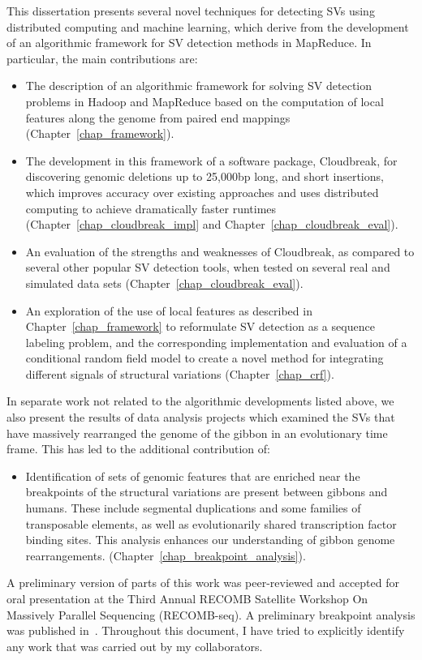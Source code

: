 This dissertation presents several novel techniques for detecting SVs using distributed computing and machine learning, which derive from the development of an algorithmic framework for SV detection methods in MapReduce. In particular, the main contributions are:

\begin{itemize}
 \item The description of an algorithmic framework for solving SV detection problems in Hadoop and MapReduce based on the computation of local features along the genome from paired end mappings (Chapter~\ref{chap_framework}).
 \item The development in this framework of a software package, Cloudbreak, for discovering genomic deletions up to 25,000bp long, and short insertions, which improves accuracy over existing approaches and uses distributed computing to achieve dramatically faster runtimes (Chapter~\ref{chap_cloudbreak_impl} and Chapter~\ref{chap_cloudbreak_eval}).
 \item An evaluation of the strengths and weaknesses of Cloudbreak, as compared to several other popular SV detection tools, when tested on several real and simulated data sets (Chapter~\ref{chap_cloudbreak_eval}).
 \item An exploration of the use of local features as described in Chapter~\ref{chap_framework} to reformulate SV detection as a sequence labeling problem, and the corresponding implementation and evaluation of a conditional random field model to create a novel method for integrating different signals of structural variations (Chapter~\ref{chap_crf}).
\end{itemize}

In separate work not related to the algorithmic developments listed above, we also present the results of data analysis projects which examined the SVs that have massively rearranged the genome of the gibbon in an evolutionary time frame. This has led to the additional contribution of:

\begin{itemize}
 \item Identification of sets of genomic features that are enriched near the breakpoints of the structural variations are present between gibbons and humans. These include segmental duplications and some families of transposable elements, as well as evolutionarily shared transcription factor binding sites. This analysis enhances our understanding of gibbon genome rearrangements. (Chapter~\ref{chap_breakpoint_analysis}).
\end{itemize}

A preliminary version of parts of this work was peer-reviewed and accepted for oral presentation at the Third Annual RECOMB Satellite Workshop On Massively Parallel Sequencing (RECOMB-seq). A preliminary breakpoint analysis was published in~\cite{Capozzi:2012bb}. Throughout this document, I have tried to explicitly identify any work that was carried out by my collaborators.
